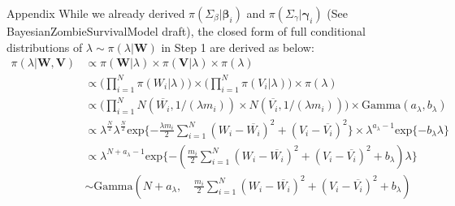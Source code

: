 \documentclass[a4paper, 12pt]{article}
\makeatletter
\renewcommand{\section}{\@startsection
	{section}    {1}    {0mm}    {-0.7\baselineskip}    {0.08\baselineskip}    {\normalfont\large\sc\center\bf}}
\makeatother
\begin{document}
\section{Appendix}
\noindent While we already derived $\pi(\Sigma_{\beta}|\mathbf{\beta}_i)$ and $\pi(\Sigma_{\gamma}|\mathbf{\gamma}_i)$ (See BayesianZombieSurvivalModel draft), the closed form of full conditional distributions of $\lambda \sim \pi(\lambda|\mathbf{W})$ in Step 1 are derived as below:
	\begin{equation*}
	\begin{aligned}
\pi(\lambda|\mathbf{W}, \mathbf{V})	&\propto\pi(\mathbf{W}|\lambda)\times \pi(\mathbf{V}|\lambda)\times \pi(\lambda) \\
	&\propto \Big(\prod_{i=1}^N \pi(W_i|\lambda)\Big) \times\Big(\prod_{i=1}^N \pi(V_i|\lambda)\Big) \times \pi(\lambda)\\
	& \propto \Big(\prod_{i=1}^N N(\overline{W_i}, 1/(\lambda m_i)) \times N(\overline{V_i}, 1/(\lambda m_i)) \Big) \times \mbox{Gamma}(a_{\lambda}, b_{\lambda})\\
	& \propto \lambda^{\frac{N}{2}} \lambda^{\frac{N}{2}} \mbox{exp}\{-\frac{\lambda m_i}{2}\sum_{i=1}^N (W_i - \overline{W_i})^2 + (V_i - \overline{V_i})^2\} \times \lambda^{a_{\lambda}-1}\mbox{exp}\{-b_{\lambda}\lambda\}\\
	& \propto \lambda^{{N} + a_{\lambda}-1}\mbox{exp}\{-(\frac{ m_i}{2}\sum_{i=1}^N (W_i - \overline{W_i})^2 + (V_i - \overline{V_i})^2+b_{\lambda})\lambda\} \\
	&\sim \mbox{Gamma}(N + a_{\lambda},\quad \frac{ m_i}{2}\sum_{i=1}^N (W_i - \overline{W_i})^2+ (V_i - \overline{V_i})^2 +b_{\lambda})	
	\end{aligned}
	\end{equation*} 
 
\end{document}
